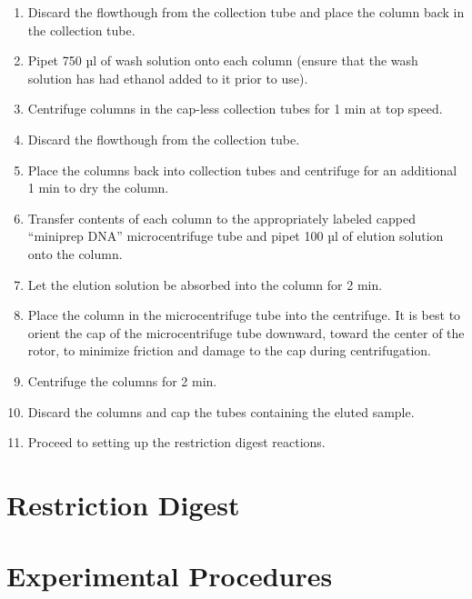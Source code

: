 \documentclass[]{book}
\begin{document}
\begin{enumerate}
\item
  Discard the flowthough from the collection tube and place the column
  back in the collection tube.
\item
  Pipet 750 µl of wash solution onto each column (ensure that the wash
  solution has had ethanol added to it prior to use).
\item
  Centrifuge columns in the cap-less collection tubes for 1 min at top
  speed.
\item
  Discard the flowthough from the collection tube.
\item
  Place the columns back into collection tubes and centrifuge for an
  additional 1 min to dry the column.
\item
  Transfer contents of each column to the appropriately labeled capped
  ``miniprep DNA'' microcentrifuge tube and pipet 100 µl of elution
  solution onto the column.
\item
  Let the elution solution be absorbed into the column for 2 min.
\item
  Place the column in the microcentrifuge tube into the centrifuge. It
  is best to orient the cap of the microcentrifuge tube downward, toward
  the center of the rotor, to minimize friction and damage to the cap
  during centrifugation.
\item
  Centrifuge the columns for 2 min.
\item
  Discard the columns and cap the tubes containing the eluted sample.
\item
  Proceed to setting up the restriction digest reactions.
\end{enumerate}

\section{Restriction Digest}\label{restriction-digest}

\section{Experimental Procedures}\label{experimental-procedures-17}
\end{document}
